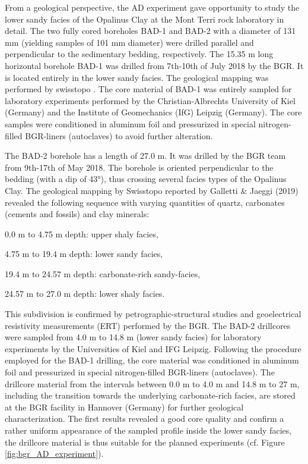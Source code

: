 From a geological perspective, the AD experiment gave opportunity to study the lower sandy facies of the Opalinus Clay at the Mont Terri rock laboratory in detail. The two fully cored boreholes BAD-1 and BAD-2 with a diameter of 131 mm (yielding samples of 101 mm diameter) were drilled parallel and perpendicular to the sedimentary bedding, respectively. The 15.35 m long horizontal borehole BAD-1 was drilled from 7th-10th of July 2018 by the BGR. It is located entirely in the lower sandy facies. The geological mapping was performed by swisstopo \cite{galletti2019}. The core material of BAD-1 was entirely sampled for laboratory experiments performed by the Christian-Albrechts University of Kiel (Germany) and the Institute of Geomechanics (IfG) Leipzig (Germany). The core samples were conditioned in aluminum foil and pressurized in special nitrogen-filled BGR-liners (autoclaves) to avoid further alteration. 

The BAD-2 borehole has a length of 27.0 m. It was drilled by the BGR team from 9th-17th of May 2018. The borehole is oriented perpendicular to the bedding (with a dip of 43°), thus crossing several facies types of the Opalinus Clay. The geological mapping by Swisstopo reported by Galletti \& Jaeggi (2019) \cite{galletti2019} revealed the following sequence with varying quantities of quartz, carbonates (cements and fossils) and clay minerals: 

\begin{list}{-}{\leftmargin=1em \itemindent=0em \itemsep=0em}
\item 0.0 m to 4.75 m depth: upper shaly facies,
\item 4.75 m to 19.4 m depth: lower sandy facies,
\item 19.4 m to 24.57 m depth: carbonate-rich sandy-facies, 
\item 24.57 m to 27.0 m depth: lower shaly facies.
\end{list}

This subdivision is confirmed by petrographic-structural studies and geoelectrical resistivity measurements (ERT) performed by the BGR. The BAD-2 drillcores were sampled from 4.0 m to 14.8 m (lower sandy facies) for laboratory experiments by the Universities of Kiel and IFG Leipzig. Following the procedure employed for the BAD-1 drilling, the core material was conditioned in aluminum foil and pressurized in special nitrogen-filled BGR-liners (autoclaves). The drillcore material from the intervals between 0.0 m to 4.0 m and 14.8 m to 27 m, including the transition towards the underlying carbonate-rich facies, are stored at the BGR facility in Hannover (Germany) for further geological characterization. The first results revealed a good core quality and confirm a rather uniform appearance of the sampled profile inside the lower sandy facies, the drillcore material is thus suitable for the planned experiments (cf. Figure \ref{fig:bgr_AD_experiment}).


